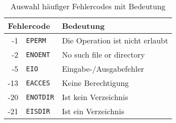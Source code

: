 \begin{table}[htb]
  \centering\small
  \begin{tabular}{|r@{~~}l|l|}
    \hline
    \multicolumn{2}{|l|}{\textbf{Fehlercode}}        & \textbf{Bedeutung} \\
    \hline
    -1      & \texttt{EPERM}     & Die Operation ist nicht erlaubt \\
    -2      & \texttt{ENOENT}    & No such file or directory \\
    -5      & \texttt{EIO}       & Eingabe-/Ausgabefehler \\
    -13     & \texttt{EACCES}    & Keine Berechtigung \\
    -20     & \texttt{ENOTDIR}   & Ist kein Verzeichnis \\
    -21     & \texttt{EISDIR}    & Ist ein Verzeichnis \\

    \hline
  \end{tabular}
  \caption{Auswahl häufiger Fehlercodes mit Bedeutung}
  \label{tab:errno}
\end{table}